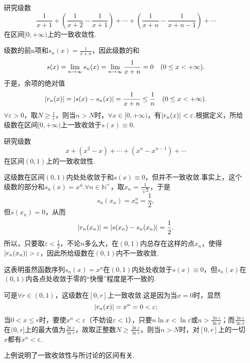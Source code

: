 \begin{example}
研究级数\[
\frac{1}{x+1} + \left(\frac{1}{x+2}-\frac{1}{x+1}\right)
+ \dotsb + \left(\frac{1}{x+n}-\frac{1}{x+n-1}\right) + \dotsb
\]在区间\([0,+\infty)\)上的一致收敛性.
\begin{solution}
级数的前n项和\(s_n(x) = \frac{1}{x+n}\)，因此级数的和\[
s(x) = \lim\limits_{n\to\infty} s_n(x) = \lim\limits_{n\to\infty} \frac{1}{x+n} = 0
\quad(0 \leq x < +\infty).
\]于是，余项的绝对值\[
\abs{r_n(x)} = \abs{s(x) - s_n(x)}
= \frac{1}{x+n} \leq \frac{1}{n}
\quad(0 \leq x < +\infty).
\]\(\forall\varepsilon>0\)，取\(N \geq \frac{1}{\varepsilon}\)，则当\(n>N\)时，\(\forall x\in[0,+\infty)\)，有\(\abs{r_n(x)} < \varepsilon\).根据定义，所给级数在区间\([0,+\infty)\)上一致收敛于\(s(x)\equiv0\).
\end{solution}
\end{example}

\begin{example}
研究级数\[
x + (x^2-x) + \dotsb + (x^n-x^{n-1}) + \dotsb
\]在区间\((0,1)\)上的一致收敛性.
\begin{solution}
这级数在区间\((0,1)\)内处处收敛于和\(s(x)\equiv0\)，但并不一致收敛.事实上，这个级数的部分和\(s_n(x) = x^n\).\(\forall n\in\mathbb{N}^+\)，取\(x_n = \frac{1}{\sqrt[n]{2}}\)，于是\[
s_n(x_n) = x_n^n = \frac{1}{2},
\]但\(s(x_n) = 0\)，从而\[
\abs{r_n(x_n)} = \abs{s(x_n) - s_n(x_n)} = \frac{1}{2}.
\]所以，只要取\(\varepsilon<\frac{1}{2}\)，不论\(n\)多么大，在\((0,1)\)内总存在这样的点\(x_n\)，使得\(\abs{r_n(x_n)}>\varepsilon\)，因此所给级数在\((0,1)\)内不一致收敛.

这表明虽然函数序列\(s_n(x) = x^n\)在\((0,1)\)内处处收敛于\(s(x)\equiv0\)，但\(s_n(x)\)在\((0,1)\)内各点处收敛于零的“快慢”程度是不一致的.

可是\(\forall r\in(0,1)\)，这级数在\([0,r]\)上一致收敛.这是因为当\(x=0\)时，显然\[
\abs{r_n(x)} = x^n = 0 < \varepsilon;
\]当\(0 < x \leq r\)时，要使\(x^n < \varepsilon\)（不妨设\(\varepsilon < 1\)），只要\(n \ln x < \ln\varepsilon\)或\(n > \frac{\ln\varepsilon}{\ln x}\)；而\(\frac{\ln\varepsilon}{\ln x}\)在\((0,r]\)上的最大值为\(\frac{\ln\varepsilon}{\ln r}\)，故取正整数\(N \geq \frac{\ln\varepsilon}{\ln r}\)，则当\(n > N\)时，对\([0,r]\)上的一切\(x\)都有\(x^n < \varepsilon\).
\end{solution}
\end{example}
上例说明了一致收敛性与所讨论的区间有关.

